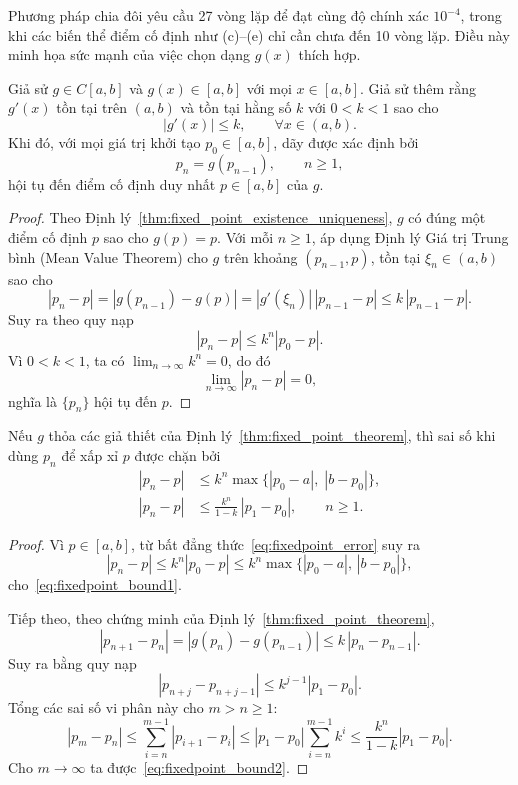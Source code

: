 \begin{remark}
Phương pháp chia đôi yêu cầu 27 vòng lặp để đạt cùng độ chính xác $10^{-4}$,
trong khi các biến thể điểm cố định như (c)–(e) chỉ cần chưa đến 10 vòng lặp.
Điều này minh họa sức mạnh của việc chọn dạng $g(x)$ thích hợp.
\end{remark}

\begin{theorem}
\label{thm:fixed_point_theorem}
Giả sử $g \in C[a,b]$ và $g(x)\in[a,b]$ với mọi $x\in[a,b]$.  
Giả sử thêm rằng $g'(x)$ tồn tại trên $(a,b)$ và tồn tại hằng số $k$ với $0<k<1$ sao cho
\[
|g'(x)| \le k, \qquad \forall x \in (a,b).
\]
Khi đó, với mọi giá trị khởi tạo $p_0 \in [a,b]$, dãy được xác định bởi
\[
p_n = g(p_{n-1}), \qquad n \ge 1,
\]
hội tụ đến điểm cố định duy nhất $p \in [a,b]$ của $g$.
\end{theorem}

\begin{proof}
Theo Định lý~\ref{thm:fixed_point_existence_uniqueness}, $g$ có đúng một điểm cố định $p$ sao cho $g(p)=p$.  
Với mỗi $n\ge1$, áp dụng Định lý Giá trị Trung bình (Mean Value Theorem) cho $g$ trên khoảng $(p_{n-1},p)$, tồn tại $\xi_n \in (a,b)$ sao cho
\[
|p_n - p|
  = |g(p_{n-1}) - g(p)|
  = |g'(\xi_n)|\,|p_{n-1}-p|
  \le k\,|p_{n-1}-p|.
\]
Suy ra theo quy nạp
\[
|p_n - p| \le k^n |p_0 - p|.
\tag{*}\label{eq:fixedpoint_error}
\]
Vì $0<k<1$, ta có $\lim_{n\to\infty} k^n = 0$, do đó
\[
\lim_{n\to\infty} |p_n - p| = 0,
\]
nghĩa là $\{p_n\}$ hội tụ đến $p$.
\end{proof}

\begin{corollary}
\label{cor:fixed_point_error}
Nếu $g$ thỏa các giả thiết của Định lý~\ref{thm:fixed_point_theorem}, thì sai số khi dùng $p_n$ để xấp xỉ $p$ được chặn bởi
\begin{align}
|p_n - p| &\le k^n \max\{|p_0 - a|,\;|b - p_0|\}, \label{eq:fixedpoint_bound1}\\[3pt]
|p_n - p| &\le \frac{k^n}{1-k}\,|p_1 - p_0|, \qquad n \ge 1. \label{eq:fixedpoint_bound2}
\end{align}
\end{corollary}

\begin{proof}
Vì $p\in[a,b]$, từ bất đẳng thức~\eqref{eq:fixedpoint_error} suy ra
\[
|p_n - p| \le k^n |p_0 - p| \le k^n \max\{|p_0 - a|,\,|b - p_0|\},
\]
cho~\eqref{eq:fixedpoint_bound1}.  

Tiếp theo, theo chứng minh của Định lý~\ref{thm:fixed_point_theorem},
\[
|p_{n+1} - p_n| = |g(p_n) - g(p_{n-1})|
 \le k\,|p_n - p_{n-1}|.
\]
Suy ra bằng quy nạp
\[
|p_{n+j} - p_{n+j-1}| \le k^{j-1}|p_1 - p_0|.
\]
Tổng các sai số vi phân này cho $m>n\ge1$:
\[
|p_m - p_n|
  \le \sum_{i=n}^{m-1}|p_{i+1}-p_i|
  \le |p_1 - p_0|\!\!\sum_{i=n}^{m-1}\!k^i
  \le \frac{k^n}{1-k}|p_1 - p_0|.
\]
Cho $m\!\to\!\infty$ ta được~\eqref{eq:fixedpoint_bound2}.
\end{proof}

